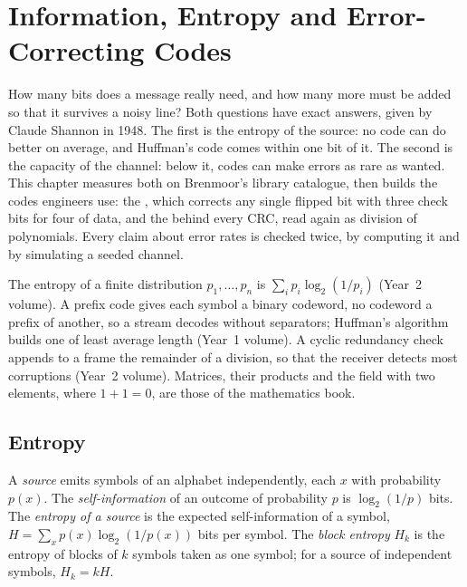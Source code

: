 \chapter{Information, Entropy and Error-Correcting Codes}\label{ch:b3:information-and-codes}

How many bits does a message really need, and how many more must be added so that it survives a noisy line? Both questions have exact answers, given by Claude Shannon in 1948. %
The first is the entropy of the source: no code can do better on average, and Huffman's code comes within one bit of it. The second is the capacity of the channel: below it, codes can make errors as rare as wanted. This chapter measures both on Brenmoor's library catalogue, then builds the codes engineers use: the , which corrects any single flipped bit with three check bits for four of data, and the  behind every CRC, read again as division of polynomials. Every claim about error rates is checked twice, by computing it and by simulating a seeded channel.

\begin{recall}
The entropy of a finite distribution $p_1, \ldots, p_n$ is $\sum_i p_i \log_2 (1/p_i)$ (Year~2 volume). A prefix code gives each symbol a binary codeword, no codeword a prefix of another, so a stream decodes without separators; Huffman's algorithm builds one of least average length (Year~1 volume). A cyclic redundancy check appends to a frame the remainder of a division, so that the receiver detects most corruptions (Year~2 volume). Matrices, their products and the field with two elements, where $1 + 1 = 0$, are those of the mathematics book.
\end{recall}

\section{Entropy}\label{sec:b3:information-and-codes:entropy}

\begin{definition}\label{def:b3:information-and-codes:entropy}
A \emph{source} emits symbols of an alphabet independently, each $x$ with probability $p(x)$. The \emph{self-information} of an outcome of probability $p$ is $\log_2 (1/p)$ bits. The \emph{entropy of a source} is the expected self-information of a symbol, $H = \sum_x p(x) \log_2 (1/p(x))$ bits per symbol. The \emph{block entropy} $H_k$ is the entropy of blocks of $k$ symbols taken as one symbol; for a source of independent symbols, $H_k = kH$.
\end{definition}

